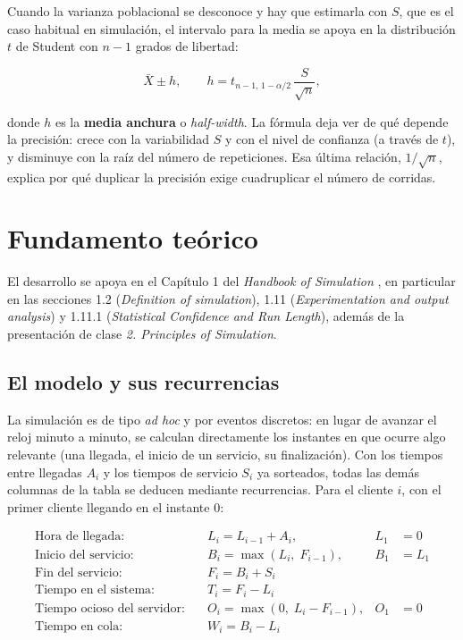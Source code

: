 \documentclass[11pt,letterpaper]{article}
\begin{document}
Cuando la varianza poblacional se desconoce y hay que estimarla con $S$, que es el caso habitual en simulación, el intervalo para la media se apoya en la distribución $t$ de Student con $n-1$ grados de libertad:

\[
\bar{X} \pm h, \qquad h = t_{n-1,\,1-\alpha/2}\,\frac{S}{\sqrt{n}},
\]

donde $h$ es la \textbf{media anchura} o \emph{half-width}. La fórmula deja ver de qué depende la precisión: crece con la variabilidad $S$ y con el nivel de confianza (a través de $t$), y disminuye con la raíz del número de repeticiones. Esa última relación, $1/\sqrt{n}$, explica por qué duplicar la precisión exige cuadruplicar el número de corridas.

\section{Fundamento teórico}

El desarrollo se apoya en el Capítulo 1 del \emph{Handbook of Simulation} \cite{Banks1998}, en particular en las secciones 1.2 (\emph{Definition of simulation}), 1.11 (\emph{Experimentation and output analysis}) y 1.11.1 (\emph{Statistical Confidence and Run Length}), además de la presentación de clase \emph{2. Principles of Simulation}.

\subsection{El modelo y sus recurrencias}

La simulación es de tipo \emph{ad hoc} y por eventos discretos: en lugar de avanzar el reloj minuto a minuto, se calculan directamente los instantes en que ocurre algo relevante (una llegada, el inicio de un servicio, su finalización). Con los tiempos entre llegadas $A_i$ y los tiempos de servicio $S_i$ ya sorteados, todas las demás columnas de la tabla se deducen mediante recurrencias. Para el cliente $i$, con el primer cliente llegando en el instante $0$:

\begin{align}
\text{Hora de llegada:} \quad & L_i = L_{i-1} + A_i, & L_1 &= 0 \label{eq:lleg}\\
\text{Inicio del servicio:} \quad & B_i = \max\left(L_i,\; F_{i-1}\right), & B_1 &= L_1 \label{eq:ini}\\
\text{Fin del servicio:} \quad & F_i = B_i + S_i & & \label{eq:fin}\\
\text{Tiempo en el sistema:} \quad & T_i = F_i - L_i & & \label{eq:sis}\\
\text{Tiempo ocioso del servidor:} \quad & O_i = \max\left(0,\; L_i - F_{i-1}\right), & O_1 &= 0 \label{eq:oci}\\
\text{Tiempo en cola:} \quad & W_i = B_i - L_i & & \label{eq:col}
\end{align}
\end{document}
